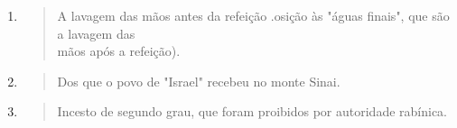 \begin{enumerate}
\def\labelenumi{\arabic{enumi}.}
\setcounter{enumi}{2}
\item
 \begin{quote}
 A lavagem das mãos antes da refeição .osição às "águas finais", que
 são a lavagem das\\
 mãos após a refeição).
 \end{quote}
\item
 \begin{quote}
 Dos que o povo de "Israel" recebeu no monte Sinai.
 \end{quote}
\item
 \begin{quote}
 Incesto de segundo grau, que foram proibidos por autoridade rabínica.
 \end{quote}
\end{enumerate}

